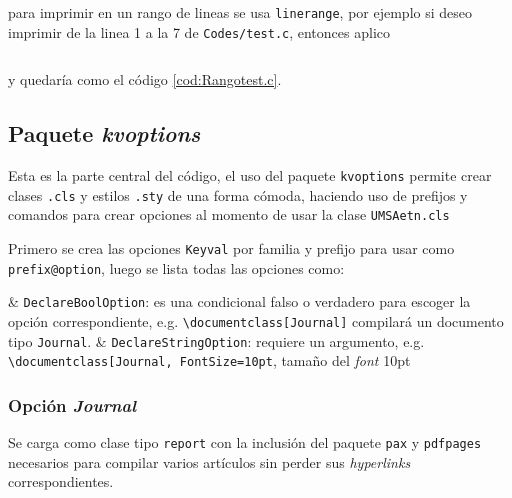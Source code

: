 \label{rangocodigo}para imprimir en un rango de lineas se usa \verb|linerange|, por ejemplo si deseo imprimir de la linea 1 a la 7 de \verb|Codes/test.c|, entonces aplico 
\begin{lstlisting}[language=tex, caption={}, label={}]

\end{lstlisting}

y quedaría como el código \ref{cod:Rangotest.c}. 


\subsection{Paquete \textit{kvoptions}}
Esta es la parte central del código, el uso del paquete \verb|kvoptions| permite crear clases \verb|.cls| y estilos \verb|.sty| de una forma cómoda, haciendo uso de prefijos y comandos para crear opciones al momento de usar la clase \verb|UMSAetn.cls| 

Primero se crea las opciones \verb|Keyval| por familia y prefijo para usar como \verb|prefix@option|, luego se lista todas las opciones como:
\Activate
\begin{easylist}[itemize]	
	& \verb|DeclareBoolOption|: es una condicional falso o verdadero para escoger la opción correspondiente, e.g. \verb|\documentclass[Journal]| compilará un documento tipo \verb|Journal|.
	& \verb|DeclareStringOption|: requiere un argumento, e.g. \verb|\documentclass[Journal, FontSize=10pt|, tamaño del \textit{font} 10pt
\end{easylist}
\Deactivate 



\subsubsection{Opción \textit{Journal}}
Se carga como clase tipo \verb|report| con la inclusión del paquete \verb|pax| y \verb|pdfpages| necesarios para compilar varios artículos sin perder sus \textit{hyperlinks} correspondientes.



